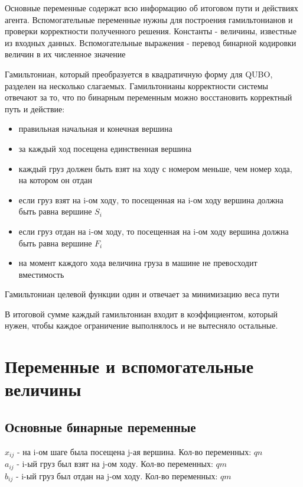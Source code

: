\documentclass{article}
\begin{document}
Основные переменные содержат всю информацию об итоговом пути и действиях агента. Вспомогательные переменные нужны для построения гамильтонианов и проверки корректности полученного решения. Константы - величины, известные из входных данных. Вспомогательные выражения - перевод бинарной кодировки величин в их численное значение \par

Гамильтониан, который преобразуется в квадратичную форму для QUBO, разделен на несколько слагаемых. Гамильтонианы корректности системы отвечают за то, что по бинарным переменным можно восстановить корректный путь и действие:
\begin{itemize}
    \item правильная начальная и конечная вершина
    \item за каждый ход посещена единственная вершина
    \item каждый груз должен быть взят на ходу с номером меньше, чем номер хода, на котором он отдан
    \item если груз взят на i-ом ходу, то посещенная на i-ом ходу вершина должна быть равна вершине $S_i$
    \item если груз отдан на i-ом ходу, то посещенная на i-ом ходу вершина должна быть равна вершине $F_i$
    \item на момент каждого хода величина груза в машине не превосходит вместимость
    
    
\end{itemize}
Гамильтониан целевой функции один и отвечает за минимизацию веса пути\par

В итоговой сумме каждый гамильтониан входит в коэффициентом, который нужен, чтобы каждое ограничение выполнялось и не вытесняло остальные.




\section{Переменные и вспомогательные величины}


\subsection{Основные бинарные переменные}
$x_{ij}$ - на i-ом шаге была посещена j-ая вершина. Кол-во переменных: \(qn\)\\
$a_{ij}$ - i-ый груз был взят на j-ом ходу. Кол-во переменных: \(qm\) \\
$b_{ij}$ - i-ый груз был отдан на j-ом ходу. Кол-во переменных: \(qm\)
\end{document}
